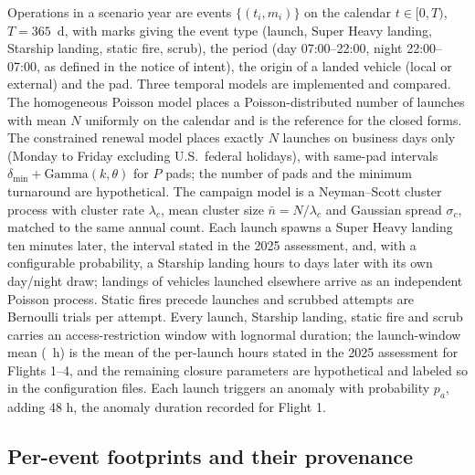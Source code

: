 \documentclass[preprint,12pt,authoryear]{elsarticle}
\begin{document}
Operations in a scenario year are events $\{(t_i, m_i)\}$ on the calendar $t \in [0, T)$, $T = 365$~d, with marks giving the event type (launch, Super Heavy landing, Starship landing, static fire, scrub), the period (day 07:00--22:00, night 22:00--07:00, as defined in the notice of intent), the origin of a landed vehicle (local or external) and the pad. Three temporal models are implemented and compared. The homogeneous Poisson model places a Poisson-distributed number of launches with mean $N$ uniformly on the calendar and is the reference for the closed forms. The constrained renewal model places exactly $N$ launches on business days only (Monday to Friday excluding U.S.\ federal holidays), with same-pad intervals $\delta_{\min} + \mathrm{Gamma}(k,\theta)$ for $P$ pads; the number of pads and the minimum turnaround are hypothetical. The campaign model is a Neyman--Scott cluster process with cluster rate $\lambda_c$, mean cluster size $\bar n = N/\lambda_c$ and Gaussian spread $\sigma_c$, matched to the same annual count. Each launch spawns a Super Heavy landing ten minutes later, the interval stated in the 2025 assessment, and, with a configurable probability, a Starship landing hours to days later with its own day/night draw; landings of vehicles launched elsewhere arrive as an independent Poisson process. Static fires precede launches and scrubbed attempts are Bernoulli trials per attempt. Every launch, Starship landing, static fire and scrub carries an access-restriction window with lognormal duration; the launch-window mean (\valRecordMeanLaunchClosureH~h) is the mean of the per-launch hours stated in the 2025 assessment for Flights 1--4, and the remaining closure parameters are hypothetical and labeled so in the configuration files. Each launch triggers an anomaly with probability $p_a$, adding 48 h, the anomaly duration recorded for Flight 1.

\subsection{Per-event footprints and their provenance}
\end{document}
